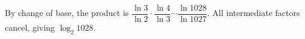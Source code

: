 By change of base, the product is $\dfrac{\ln3}{\ln2}\cdot\dfrac{\ln4}{\ln3}\cdots\dfrac{\ln1028}{\ln1027}$. All intermediate factors cancel, giving $\boxed{\log_2 1028}$.
